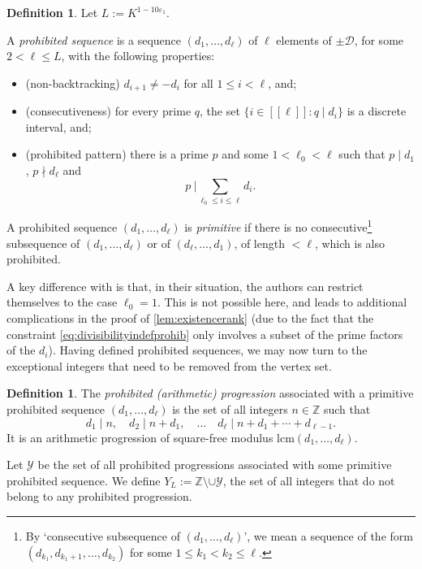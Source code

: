 \documentclass[11pt]{amsart}
\theoremstyle{definition}
\newtheorem{definition}[theorem]{Definition}
\renewcommand{\leq}{\leqslant}
\newcommand{\sinterval}[1]{[\![#1]\!] }
\newcommand{\eps}{\varepsilon}
\newcommand{\Z}{\mathbb{Z}}
\newcommand{\D}{\mathcal{D}}
\newcommand{\cstH}{\eps_1}
\newcommand{\boundelln}{\repK^{1-10\cstH}}
\newcommand{\bmid}{\  \Big\vert}
\newcommand{\ellp}{\ell}
\newcommand{\ellm}{\ell_0}
\newcommand{\elln}{L}
\newcommand{\Y}{Y_{\!\elln}}
\newcommand{\prohibprog}{\mathcal{Y}}
\newcommand{\repK}{K}
\begin{document}
\begin{definition}
\label{def:prohibitedsequence}
Let $\elln := \boundelln$.

A \emph{prohibited sequence} is a sequence $(d_1, \ldots, d_{\ellp})$ of $\ellp$ elements of $\pm \D$, for some $2<\ellp\leq \elln$, with the following properties:
\begin{itemize}
	\item (non-backtracking) $d_{i+1}\neq -d_i$ for all $1\leq i<\ellp$, and;
	\item (consecutiveness) for every prime $q$, the set $\{i\in \sinterval{\ellp} : q\mid d_i\}$ is a discrete interval, and;
	\item (prohibited pattern) there is a prime $p$ and some $1<\ellm< \ellp$ such that $p\mid d_1$, $p\nmid d_{\ellp}$ and 
	\begin{equation}
	\label{eq:divisibilityindefprohib}
		p\bmid \sum_{\ellm\leq i \leq \ellp} d_i.
	\end{equation}
\end{itemize}
A prohibited sequence $(d_1, \ldots, d_{\ellp})$ is \emph{primitive} if there is no consecutive\footnote{By `consecutive subsequence of $(d_1, \ldots, d_{\ellp})$', we mean a sequence of the form $(d_{k_1}, d_{k_1+1},\ldots, d_{k_2})$ for some ${1\leq k_1<k_2\leq \ellp}$.} subsequence of $(d_1, \ldots, d_{\ellp})$ or of $(d_{\ellp}, \ldots, d_1)$, of length $<\ellp$, which is also prohibited.
\end{definition}

A key difference with \cite{HR} is that, in their situation, the authors can restrict themselves to the case $\ellm = 1$. This is not possible here, and leads to additional complications in the proof of \cref{lem:existencerank} (due to the fact that the constraint \cref{eq:divisibilityindefprohib} only involves a subset of the prime factors of the $d_i$). Having defined prohibited sequences, we may now turn to the exceptional integers that need to be removed from the vertex set.

\begin{definition}
\label{def:prohibitedprogression}
The \emph{prohibited (arithmetic) progression} associated with a primitive prohibited sequence $(d_1, \ldots, d_{\ellp})$ is the set of all integers $n\in \Z$ such that
\begin{equation*}
d_1\mid n, \quad d_2\mid n+d_1, \quad \ldots \quad d_{\ellp}\mid n+d_1+\cdots+d_{\ellp-1}.
\end{equation*}
It is an arithmetic progression of square-free modulus $\mathrm{lcm}(d_1,\ldots, d_{\ellp})$.

Let $\prohibprog$ be the set of all prohibited progressions associated with some primitive prohibited sequence. We define $\Y := \mathbb{Z} \setminus \cup \prohibprog$, the set of all integers that do not belong to any prohibited progression. 
\end{definition}
\end{document}
